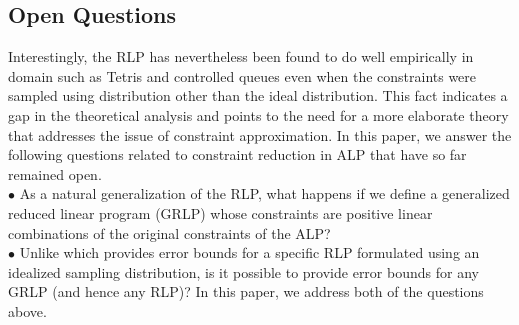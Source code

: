 \subsection{Open Questions}
Interestingly, the RLP has nevertheless been found to do well empirically in domain such as Tetris \cite{CST} and controlled queues \cite{CS} even when the constraints were sampled using distribution other than the ideal distribution. This fact indicates a gap in the theoretical analysis and points to the need for a more elaborate theory that addresses the issue of constraint approximation. In this paper, we answer the following questions related to constraint reduction in ALP that have so far remained open. \\
$\bullet$ As a natural generalization of the RLP, what happens if we define a generalized reduced linear program (GRLP) whose constraints are positive linear combinations of the original constraints of the ALP?\\
$\bullet$ Unlike \cite{CS} which provides error bounds for a specific RLP formulated using an idealized sampling distribution, is it possible to provide error bounds for any GRLP (and hence any RLP)?
In this paper, we address both of the questions above.
